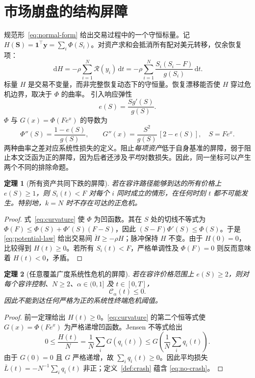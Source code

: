 \documentclass[11pt]{article}
\numberwithin{equation}{section}
\newtheorem{theorem}{定理}[section]
\theoremstyle{definition}
\theoremstyle{remark}
\newcommand{\Cris}{\mathcal{C}}
\newcommand{\dd}{\,\mathrm{d}}
\newcommand{\one}{\mathbf{1}}
\begin{document}
\section{市场崩盘的结构屏障}\label{sec:barriers}
规范形~\eqref{eq:normal-form} 给出交易过程中的一个守恒标量。记 $H(\bm S)=\one^\top\bm y=\sum_i\Phi(S_i)$。对资产求和会抵消所有配对美元转移，仅余恢复项：
\begin{equation}\label{eq:potential-law}
\boxed{\dd H=-\rho\sum_{i=1}^N\mathcal R(y_i)\dd t
=-\rho\sum_{i=1}^N\frac{S_i(S_i-F)}{g(S_i)}\dd t.}
\end{equation}
标量 $H$ 是交易不变量，而非完整恢复动态下的守恒量。恢复漂移能否使 $H$ 穿过危机边界，取决于 $\Phi$ 的曲率。
引入响应弹性
\begin{equation}\label{eq:elasticity}
e(S)=\frac{Sg'(S)}{g(S)}.
\end{equation}
$\Phi$ 与 $G(x)=\Phi(Fe^x)$ 的导数为
\begin{equation}\label{eq:curvature}
\Phi''(S)=\frac{1-e(S)}{g(S)},\qquad
G''(x)=\frac{S^2}{g(S)}\,[2-e(S)],\quad S=Fe^x.
\end{equation}
两种曲率之差对应系统性损失的定义。阻止\emph{每项资产}低于自身基准的屏障，弱于阻止本文泛函为正的屏障，因为后者还涉及\emph{平均}对数损失。因此，同一坐标可以产生两个不同的排除命题。


\begin{theorem}[所有资产共同下跌的屏障]\label{thm:barrier1}
若在容许路径能够到达的所有价格上 $e(S)\ge1$，则 $S_i(t)<F$ 对每个 $i$ 同时成立的情形，在任何时刻 $t$ 都不可能发生。特别地，$k=N$ 时不存在可达的正危机。
\end{theorem}
\begin{proof}
式~\eqref{eq:curvature} 使 $\Phi$ 为凹函数。其在 $S$ 处的切线不等式为 $\Phi(F)\le\Phi(S)+\Phi'(S)(F-S)$，因此 $(S-F)\Phi'(S)\le\Phi(S)$。于是 \eqref{eq:potential-law} 给出交易间 $\dot H\ge-\rho H$；脉冲保持 $H$ 不变。由于 $H(0)=0$，比较得到 $H(t)\ge0$。若所有 $S_i(t)<F$，严格单调性及 $\Phi(F)=0$ 则反而意味着 $H(t)<0$，矛盾。
\end{proof}

\begin{theorem}[任意覆盖广度系统性危机的屏障]\label{thm:barrier2}
若在容许价格范围上 $e(S)\ge2$，则对每个容许控制、$N\ge2$、$\alpha\in(0,1]$ 及 $t\in[0,T]$，
\begin{equation}\label{eq:no-crash}
\boxed{\Cris_\alpha(t)\le0.}
\end{equation}
因此不能到达任何严格为正的系统性终端危机阈值。
\end{theorem}
\begin{proof}
前一定理给出 $H(t)\ge0$。\eqref{eq:curvature} 的第二个恒等式使 $G(x)=\Phi(Fe^x)$ 为严格递增凹函数。Jensen 不等式给出
\[
0\le\frac{H(t)}N=\frac1N\sum_iG(q_i(t))
\le G\!\left(\frac1N\sum_iq_i(t)\right).
\]
由于 $G(0)=0$ 且 $G$ 严格递增，故 $\sum_iq_i(t)\ge0$。因此平均损失 $\overline L(t)=-N^{-1}\sum_iq_i(t)$ 非正；定义~\ref{def:crash} 蕴含 \eqref{eq:no-crash}。
\end{proof}
\end{document}
